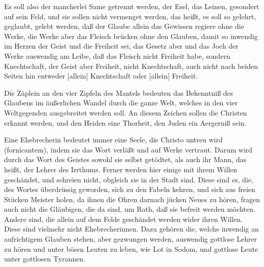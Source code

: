 Es soll also der mancherlei Same getrennt werden, der Esel, das Leinen, gesondert auf sein Feld, und sie sollen nicht vermenget werden, das heißt, es soll so gelehrt, geglaubt, gelebt werden, daß der Glaube allein das Gewissen regiere ohne die Werke, die Werke aber das Fleisch brücken ohne den Glauben, damit so inwendig im Herzen der Geist und die Freiheit sei, das Gesetz aber und das Joch der Werke auswendig am Leibe, daß das Fleisch nicht Freiheit habe, sondern Knechtschaft, der Geist aber Freiheit, nicht Knechtschaft, auch nicht nach beiden Seiten hin entweder [allein] Knechtschaft oder [allein] Freiheit.

Die Zäplein an den vier Zipfeln des Mantels bedeuten das Bekenntniß des Glaubens im äußerlichen Wandel durch die ganze Welt, welches in den vier Weltgegenden ausgebreitet werden soll. An diesem Zeichen sollen die Christen erkannt werden, und den Heiden eine Thorheit, den Juden ein Aergerniß sein.

Eine Ehebrecherin bedeutet immer eine Seele, die Christo untreu wird (fornicantem), indem sie das Wort verläßt und auf Werke vertraut. Darum wird durch das Wort des Geistes sowohl sie selbst getödtet, als auch ihr Mann, das heißt, der Lehrer des Irrthums. Ferner werden hier einige mit ihrem Willen geschändet, und schreien nicht, obgleich sie in der Stadt sind. Diese sind es, die, des Wortes überdrüssig geworden, sich zu den Fabeln kehren, und sich aus freien Stücken Meister holen, da ihnen die Ohren darnach jücken Neues zu hören, fragen auch nicht die Gläubigen, die da sind, um Rath, daß sie befreit werden möchten. Andere sind, die allein auf dem Felde geschändet werden wider ihren Willen. Diese sind vielmehr nicht Ehebrecherinnen. Dazu gehören die, welche inwendig an aufrichtigem Glauben stehen, aber gezwungen werden, auswendig gottlose Lehrer zu hören und unter bösen Leuten zu leben, wie Lot in Sodom, und gottlose Leute unter gottlosen Tyrannen.

